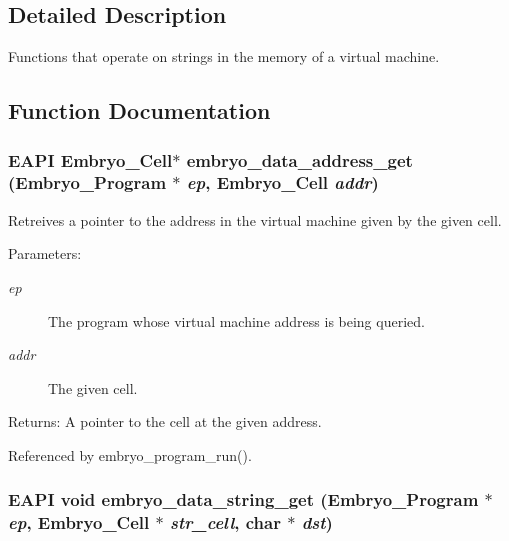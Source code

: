 \subsection{Detailed Description}
Functions that operate on strings in the memory of a virtual machine. 



\subsection{Function Documentation}
\hypertarget{group__Embryo__Data__String__Group_ga9c6beeb074c4495711c4817874ce04e}{
\subsubsection{\setlength{\rightskip}{0pt plus 5cm}EAPI Embryo\_\-Cell$\ast$ embryo\_\-data\_\-address\_\-get (Embryo\_\-Program $\ast$ {\em ep}, \/  Embryo\_\-Cell {\em addr})}}
\label{group__Embryo__Data__String__Group_ga9c6beeb074c4495711c4817874ce04e}


Retreives a pointer to the address in the virtual machine given by the given cell. 

\begin{Desc}
\item[Parameters:]
\begin{description}
\item[{\em ep}]The program whose virtual machine address is being queried. \item[{\em addr}]The given cell. \end{description}
\end{Desc}
\begin{Desc}
\item[Returns:]A pointer to the cell at the given address. \end{Desc}


Referenced by embryo\_\-program\_\-run().\hypertarget{group__Embryo__Data__String__Group_g6056316c070a146eb63f08e8e4176328}{
\subsubsection{\setlength{\rightskip}{0pt plus 5cm}EAPI void embryo\_\-data\_\-string\_\-get (Embryo\_\-Program $\ast$ {\em ep}, \/  Embryo\_\-Cell $\ast$ {\em str\_\-cell}, \/  char $\ast$ {\em dst})}}
\label{group__Embryo__Data__String__Group_g6056316c070a146eb63f08e8e4176328}


